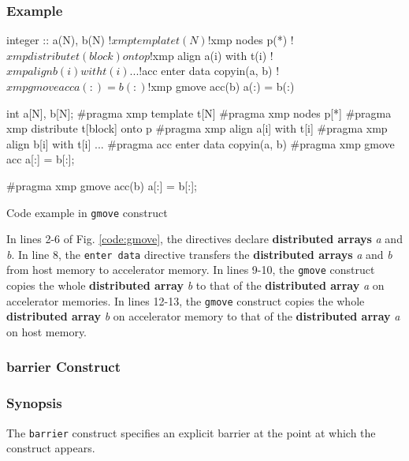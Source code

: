 \subsubsection*{Example}
\begin{myfigure}
\begin{minipage}{0.45\hsize}
\begin{center}
\begin{XACCFexampleL}
integer :: a(N), b(N)
!$xmp template t(N)
!$xmp nodes p(*)
!$xmp distribute t(block) onto p
!$xmp align a(i) with t(i)
!$xmp align b(i) with t(i)
...
!$acc enter data copyin(a, b)
!$xmp gmove acc
  a(:) = b(:)

!$xmp gmove acc(b)
  a(:) = b(:)
\end{XACCFexampleL}
\end{center}
\end{minipage}
%
\begin{minipage}{0.53\hsize}
\begin{center}
\begin{XACCCexampleR}
int a[N], b[N];
#pragma xmp template t[N]
#pragma xmp nodes p[*]
#pragma xmp distribute t[block] onto p
#pragma xmp align a[i] with t[i]
#pragma xmp align b[i] with t[i]
...
#pragma acc enter data copyin(a, b)
#pragma xmp gmove acc
  a[:] = b[:];

#pragma xmp gmove acc(b)
  a[:] = b[:];
\end{XACCCexampleR}
\end{center}
\end{minipage}
\caption{Code example in {\tt gmove} construct}\label{code:gmove}
\end{myfigure}

In lines 2-6 of Fig. \ref{code:gmove},
the directives declare {\bf distributed arrays} {\it a} and {\it b}.
In line 8,
the {\tt enter data} directive transfers the {\bf distributed arrays} {\it a} and {\it b} from host memory to accelerator memory.
In lines 9-10,
the {\tt gmove} construct copies the whole {\bf distributed array} {\it b} to
that of the {\bf distributed array} {\it a} on accelerator memories.
In lines 12-13,
the {\tt gmove} construct copies the whole {\bf distributed array} {\it b} on accelerator memory to
that of the {\bf distributed array} {\it a} on host memory.

\subsubsection{barrier Construct}\label{sec:barrier}
\subsubsection*{Synopsis}
The {\tt barrier} construct specifies an explicit barrier
at the point at which the construct appears.

